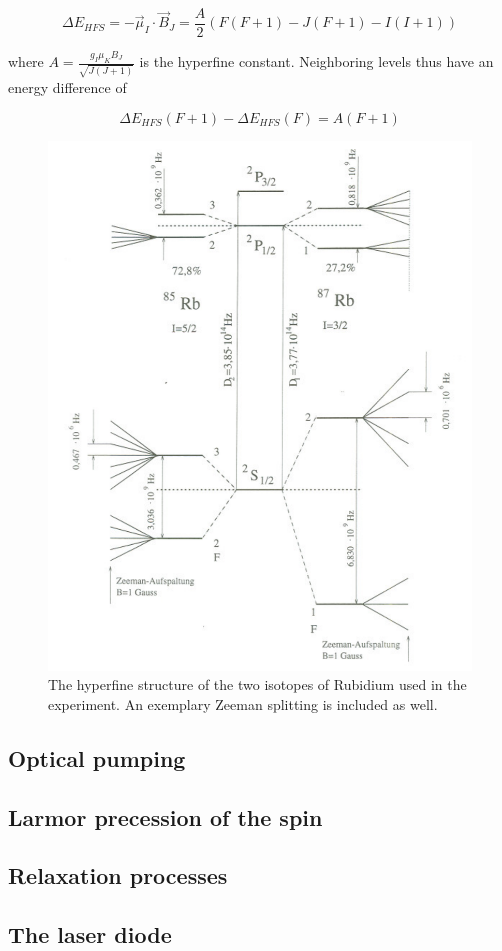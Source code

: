 \begin{equation}
\Delta E_{HFS}=-\vec{\mu}_I\cdot\vec{B}_J=\frac{A}{2}(F(F+1)-J(F+1)-I(I+1))
\end{equation}

where $A=\frac{g_I\mu_KB_J}{\sqrt{J(J+1)}}$ is the hyperfine constant. Neighboring levels thus have an energy difference of

\begin{equation}
\Delta E_{HFS}(F+1)-\Delta E_{HFS}(F)=A(F+1)
\end{equation}

\begin{figure}[H]
\centering
\includegraphics[width=1.0\linewidth]{graphics/hyperfinestructure}
\caption[Hyperfine structure of Rubidium]{The hyperfine structure of the two isotopes of Rubidium used in the experiment. An exemplary Zeeman splitting is included as well. \cite{staatsex}}
\label{fig:hyperfinestructure}
\end{figure}


\subsection{Optical pumping}
\subsection{Larmor precession of the spin}
\subsection{Relaxation processes}
\subsection{The laser diode}
